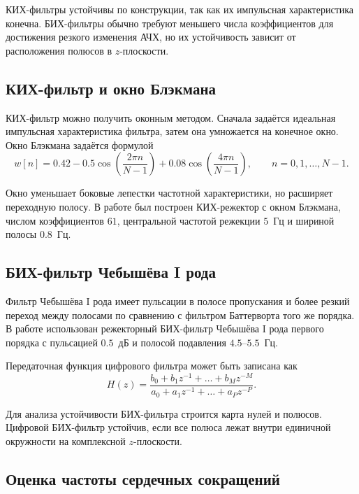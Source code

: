 \documentclass[a4paper,12pt]{article}
\begin{document}
КИХ-фильтры устойчивы по конструкции, так как их импульсная характеристика конечна. БИХ-фильтры обычно требуют меньшего числа коэффициентов для достижения резкого изменения АЧХ, но их устойчивость зависит от расположения полюсов в $z$-плоскости.

\subsection{КИХ-фильтр и окно Блэкмана}

КИХ-фильтр можно получить оконным методом. Сначала задаётся идеальная импульсная характеристика фильтра, затем она умножается на конечное окно. Окно Блэкмана задаётся формулой
\begin{equation}
    w[n] = 0.42 - 0.5\cos\left(\frac{2\pi n}{N-1}\right) + 0.08\cos\left(\frac{4\pi n}{N-1}\right),
    \qquad n=0,1,\ldots,N-1.
    \label{eq:blackman}
\end{equation}

Окно уменьшает боковые лепестки частотной характеристики, но расширяет переходную полосу. В работе был построен КИХ-режектор с окном Блэкмана, числом коэффициентов $61$, центральной частотой режекции $5$~Гц и шириной полосы $0.8$~Гц.

\subsection{БИХ-фильтр Чебышёва I рода}

Фильтр Чебышёва I рода имеет пульсации в полосе пропускания и более резкий переход между полосами по сравнению с фильтром Баттерворта того же порядка. В работе использован режекторный БИХ-фильтр Чебышёва I рода первого порядка с пульсацией $0.5$~дБ и полосой подавления $4.5$--$5.5$~Гц.

Передаточная функция цифрового фильтра может быть записана как
\begin{equation}
    H(z)=\frac{b_0+b_1z^{-1}+\ldots+b_Mz^{-M}}{a_0+a_1z^{-1}+\ldots+a_Pz^{-P}}.
\end{equation}

Для анализа устойчивости БИХ-фильтра строится карта нулей и полюсов. Цифровой БИХ-фильтр устойчив, если все полюса лежат внутри единичной окружности на комплексной $z$-плоскости.

\subsection{Оценка частоты сердечных сокращений}
\end{document}

